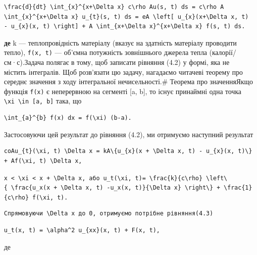 \documentclass[
  ukrainian,
]{article}
\begin{document}
\begin{verbatim}
\frac{d}{dt} \int_{x}^{x+\Delta x} c\rho Au(s, t) ds = c\rho A \int_{x}^{x+\Delta x} u_{t}(s, t) ds = eA \left[ u_{x}(x+\Delta x, t) - u_{x}(x, t) \right] + A \int_{x+\Delta x}^{x+\Delta x} f(s, t) ds.
\end{verbatim}

\textbf{де} k --- теплопровідність матеріалу (вказує на здатність
матеріалу проводити тепло), \texttt{f(x,\ t)} --- об'ємна потужність
зовнішнього джерела тепла (калорії/см·с).Задача полягає в тому, щоб
записати рівняння (4.2) у формі, яка не містить інтегралів. Щоб
розв'язати цю задачу, нагадаємо читачеві теорему про середнє значення з
ходу інтегральної нечисельності.\# Теорема про значенняЯкщо функція
\texttt{f(x)} є неперервною на сегменті {[}a, b{]}, то існує принаймні
одна точка \texttt{\textbackslash{}xi\ \textbackslash{}in\ {[}a,\ b{]}}
така, що

\begin{verbatim}
\int_{a}^{b} f(x) dx = f(\xi) (b-a).
\end{verbatim}

Застосовуючи цей результат до рівняння (4.2), ми отримуємо наступний
результат

\begin{verbatim}
coAu_{t}(\xi, t) \Delta x = kA\{u_{x}(x + \Delta x, t) - u_{x}(x, t)\} + Af(\xi, t) \Delta x,
\end{verbatim}

\texttt{x\ \textless{}\ \textbackslash{}xi\ \textless{}\ x\ +\ \textbackslash{}Delta\ x,\ або\ \textquotesingle{}u\_t\textquotesingle{}(\textbackslash{}xi,\ t)\textquotesingle{}=\ \textbackslash{}frac\{k\}\{c\textbackslash{}rho\}\ \textbackslash{}left\textbackslash{}\{\ \textbackslash{}frac\{\textquotesingle{}u\_x\textquotesingle{}(x\ +\ \textbackslash{}Delta\ x,\ t)\ -\textquotesingle{}u\_x\textquotesingle{}(x,\ t)\}\{\textbackslash{}Delta\ x\}\ \textbackslash{}right\textbackslash{}\}\ +\ \textbackslash{}frac\{1\}\{c\textquotesingle{}\textbackslash{}rho\}\ f(\textbackslash{}xi,\ t).}

\begin{verbatim}
Спрямовуючи \Delta x до 0, отримуємо потрібне рівняння(4.3)
\end{verbatim}

\begin{verbatim}
u_t(x, t) = \alpha^2 u_{xx}(x, t) + F(x, t),
\end{verbatim}

де
\end{document}
